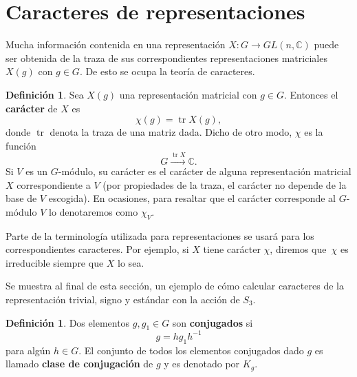 \documentclass[12pt]{book}
\theoremstyle{definition}
\newtheorem{definition}[theorem]{Definición}
\DeclareMathOperator{\tr}{tr}
\newcounter{in}
\newcounter{ini}
\begin{document}
\section{Caracteres de representaciones}
\label{caracteres}

Mucha información contenida en una representación $X:G\rightarrow
GL(n,\mathbb{C})$ puede ser obtenida de la traza de sus
correspondientes representaciones matriciales $X(g)$ con $g\in G$. De
esto se ocupa la teoría de caracteres.

\begin{definition}
  Sea $X(g)$ una representación matricial con $g\in G$. Entonces el \textbf{carácter} de $X$ es
  \begin{equation*}
    \chi(g)=\tr X(g),
  \end{equation*}
  donde $\tr$ denota la traza de una matriz dada. Dicho de otro modo,
  $\chi$ es la función
\begin{equation*}
  G\stackrel{\tr X}{\rightarrow}\mathbb{C}.
\end{equation*}
Si $V$ es un $G$-módulo, su carácter es el carácter de alguna
representación matricial $X$ correspondiente a $V$ (por propiedades de
la traza, el carácter no depende de la base de $V$ escogida). En ocasiones, para resaltar
que el carácter corresponde al $G$-módulo $V$ lo denotaremos como $\chi_{V}$.
\end{definition}

Parte de la terminología utilizada para representaciones se
usará para los correspondientes caracteres. Por ejemplo, si $X$ tiene
carácter $\chi$, diremos que~$\chi$ es irreducible siempre que $X$ lo
sea.

Se muestra al final de esta sección, un ejemplo de cómo calcular caracteres de la representación
trivial, signo y estándar con la acción de $S_{3}$.
\begin{definition}
  Dos elementos $g,g_{1}\in G$ son \textbf{conjugados} si
  \begin{equation*}
  g=hg_{1}h^{-1}
\end{equation*}
para algún $h\in G$. El conjunto de todos los elementos conjugados
dado $g$ es llamado \textbf{clase de conjugación} de $g$ y es
denotado por $K_{g}$.
\end{definition}
\end{document}
